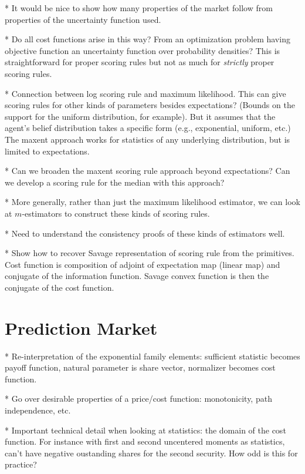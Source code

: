 \documentclass[11pt,letterpaper]{article}
\begin{document}
* It would be nice to show how many properties of the market follow from properties of the uncertainty function used.

* Do all cost functions arise in this way? From an optimization problem having objective function an uncertainty function over probability densities? This is straightforward for proper scoring rules but not as much for \emph{strictly} proper scoring rules.

* Connection between log scoring rule and maximum likelihood. This can give scoring rules for other kinds of parameters besides expectations? (Bounds on the support for the uniform distribution, for example). But it assumes that the agent's belief distribution takes a specific form (e.g., exponential, uniform, etc.) The maxent approach works for statistics of any underlying distribution, but is limited to expectations.

* Can we broaden the maxent scoring rule approach beyond expectations? Can we develop a scoring rule for the median with this approach?

* More generally, rather than just the maximum likelihood estimator, we can look at $m$-estimators to construct these kinds of scoring rules.

* Need to understand the consistency proofs of these kinds of estimators well.

* Show how to recover Savage representation of scoring rule from the primitives. Cost function is composition of adjoint of expectation map (linear map) and conjugate of the information function. Savage convex function is then the conjugate of the cost function.



\section{Prediction Market}

* Re-interpretation of the exponential family elements: sufficient statistic becomes payoff function, natural parameter is share vector, normalizer becomes cost function.

* Go over desirable properties of a price/cost function: monotonicity, path independence, etc.

* Important technical detail when looking at statistics: the domain of the cost function. For instance with first and second uncentered moments as statistics, can't have negative oustanding shares for the second security. How odd is this for practice?
\end{document}
